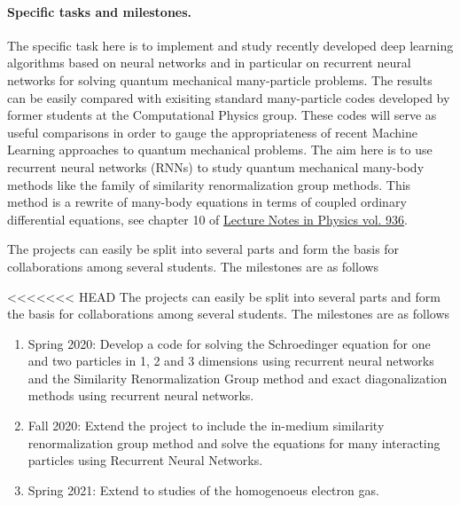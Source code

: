 \documentclass[%
oneside,                 %
final,                   %
10pt]{article}
\begin{document}
\paragraph{Specific tasks and milestones.}
The specific task here is to implement and study recently developed
deep learning algorithms based on neural networks and in particular on
recurrent neural networks for solving quantum mechanical many-particle
problems. The results can be easily compared with exisiting standard
many-particle codes developed by former students at the Computational
Physics group. These codes will serve as useful comparisons in order
to gauge the appropriateness of recent Machine Learning approaches to
quantum mechanical problems.  The aim here is to use recurrent neural
networks (RNNs) to study quantum mechanical many-body methods like the family
of similarity renormalization group methods.  This method is a rewrite
of many-body equations in terms of coupled ordinary differential
equations, see chapter 10 of \href{{https://www.springer.com/gp/book/9783319533353}}{Lecture Notes in Physics
vol. 936}.



The projects can easily be split into several parts and form the basis
for collaborations among several students. The milestones are as
follows

<<<<<<< HEAD
The projects can easily be split into several parts and form the basis for collaborations among several students. The milestones are as follows
\begin{enumerate}
\item Spring 2020: Develop a code for solving the Schroedinger equation for one and two particles in 1, 2 and 3 dimensions using recurrent neural networks and the Similarity Renormalization Group method and exact diagonalization methods using recurrent neural networks.

\item Fall 2020: Extend the project to include the in-medium similarity renormalization group method and solve the equations for many interacting particles using Recurrent Neural Networks.

\item Spring 2021: Extend to studies of the homogenoeus electron gas.
\end{enumerate}
\end{document}
